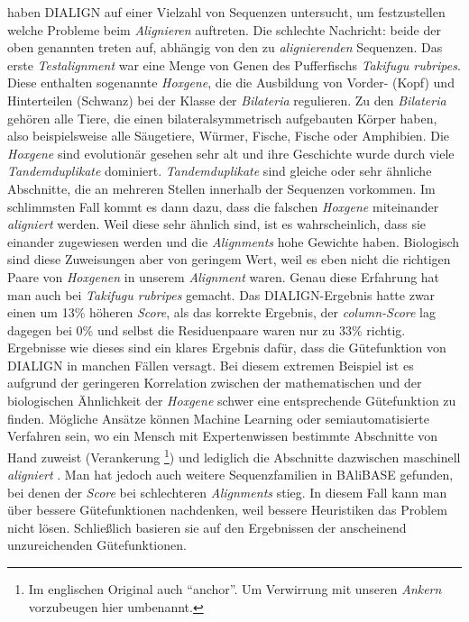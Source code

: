\cite{mpps06} haben DIALIGN auf einer Vielzahl von Sequenzen untersucht, um festzustellen welche Probleme beim \emph{Alignieren} auftreten. Die schlechte Nachricht: beide der oben genannten treten auf, abhängig von den zu \emph{alignierenden} Sequenzen. Das erste \emph{Testalignment} war eine Menge von Genen des Pufferfischs \emph{Takifugu rubripes}. Diese enthalten sogenannte \emph{Hoxgene}, die die Ausbildung von Vorder- (Kopf) und Hinterteilen (Schwanz) bei der Klasse der \emph{Bilateria} regulieren. Zu den \emph{Bilateria} gehören alle Tiere, die einen bilateralsymmetrisch aufgebauten Körper haben, also beispielsweise alle Säugetiere, Würmer, Fische, Fische oder Amphibien. Die \emph{Hoxgene} sind evolutionär gesehen sehr alt und ihre Geschichte wurde durch viele \emph{Tandemduplikate} dominiert. \emph{Tandemduplikate} sind gleiche oder sehr ähnliche Abschnitte, die an mehreren Stellen innerhalb der Sequenzen vorkommen. Im schlimmsten Fall kommt es dann dazu, dass die falschen \emph{Hoxgene} miteinander \emph{aligniert} werden. Weil diese sehr ähnlich sind, ist es wahrscheinlich, dass sie einander zugewiesen werden und die \emph{Alignments} hohe Gewichte haben. Biologisch sind diese Zuweisungen aber von geringem Wert, weil es eben nicht die richtigen Paare von \emph{Hoxgenen} in unserem \emph{Alignment} waren. Genau diese Erfahrung hat man auch bei \emph{Takifugu rubripes} gemacht. Das DIALIGN-Ergebnis hatte zwar einen um 13\% höheren \emph{Score}, als das korrekte Ergebnis, der \emph{column-Score} lag dagegen bei 0\% und selbst die Residuenpaare waren nur zu 33\% richtig. Ergebnisse wie dieses sind ein klares Ergebnis dafür, dass die Gütefunktion von DIALIGN in manchen Fällen versagt. Bei diesem extremen Beispiel ist es aufgrund der geringeren Korrelation zwischen der mathematischen und der biologischen Ähnlichkeit der \emph{Hoxgene} schwer eine entsprechende Gütefunktion zu finden. Mögliche Ansätze können Machine Learning oder semiautomatisierte Verfahren sein, wo ein Mensch mit Expertenwissen bestimmte Abschnitte von Hand zuweist (Verankerung \footnote{Im englischen Original auch \enquote{anchor}. Um Verwirrung mit unseren \emph{Ankern} vorzubeugen hier umbenannt.}) und lediglich die Abschnitte dazwischen maschinell \emph{aligniert} \citep{mpps06}. Man hat jedoch auch weitere Sequenzfamilien in BAliBASE gefunden, bei denen der \emph{Score} bei schlechteren \emph{Alignments} stieg. In diesem Fall kann man über bessere Gütefunktionen nachdenken, weil bessere Heuristiken das Problem nicht lösen. Schließlich basieren sie auf den Ergebnissen der anscheinend unzureichenden Gütefunktionen.

